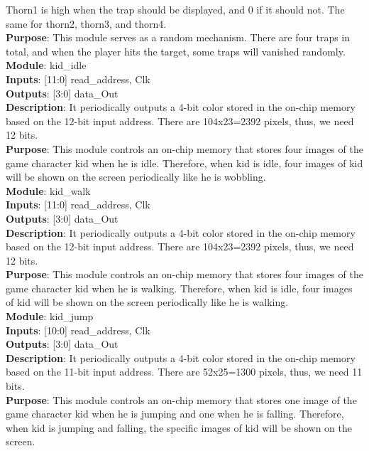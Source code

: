 \documentclass[12pt]{article}
\begin{document}
Thorn1 is high when the trap should be displayed, and 0 if it should not.
The same for thorn2, thorn3, and thorn4. \\ 
\textbf{Purpose}: This module serves as a random mechanism. There are four traps in total, and when the player hits the target, some traps will vanished randomly. \\

\textbf{Module}: kid\_idle \\ 
\textbf{Inputs}: [11:0] read\_address, Clk \\ 
\textbf{Outputs}: [3:0] data\_Out \\
\textbf{Description}: It periodically outputs a 4-bit color stored in the on-chip memory based on the 12-bit input address. There are 104x23=2392 pixels, thus, we need 12 bits. \\ 
\textbf{Purpose}: This module controls an on-chip memory that stores four images of the game character kid when he is idle. Therefore, when kid is idle, four images of kid will be shown on the screen periodically like he is wobbling. \\

\textbf{Module}: kid\_walk \\ 
\textbf{Inputs}: [11:0] read\_address, Clk \\ 
\textbf{Outputs}: [3:0] data\_Out \\
\textbf{Description}: It periodically outputs a 4-bit color stored in the on-chip memory based on the 12-bit input address. There are 104x23=2392 pixels, thus, we need 12 bits. \\ 
\textbf{Purpose}: This module controls an on-chip memory that stores four images of the game character kid when he is walking. Therefore, when kid is idle, four images of kid will be shown on the screen periodically like he is walking. \\

\textbf{Module}: kid\_jump \\
\textbf{Inputs}: [10:0] read\_address, Clk \\ 
\textbf{Outputs}: [3:0] data\_Out \\
\textbf{Description}: It periodically outputs a 4-bit color stored in the on-chip memory based on the 11-bit input address. There are 52x25=1300 pixels, thus, we need 11 bits. \\ 
\textbf{Purpose}: This module controls an on-chip memory that stores one image of the game character kid when he is jumping and one when he is falling. Therefore, when kid is jumping and falling, the specific images of kid will be shown on the screen. \\
\end{document}
